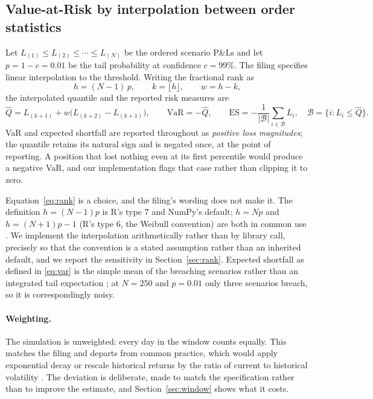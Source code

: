 \documentclass[11pt]{article}
\begin{document}
\subsection{Value-at-Risk by interpolation between order statistics}
\label{sec:var-method}

Let $L_{(1)}\le L_{(2)}\le\cdots\le L_{(N)}$ be the ordered scenario P\&Ls and let
$p=1-c=0.01$ be the tail probability at confidence $c=99\%$. The filing specifies linear
interpolation to the threshold. Writing the fractional rank as
\begin{equation}
  h=(N-1)\,p,
  \qquad
  k=\lfloor h\rfloor,
  \qquad
  w=h-k,
  \label{eq:rank}
\end{equation}
the interpolated quantile and the reported risk measures are
\begin{equation}
  \hat{Q}=L_{(k+1)}+w\bigl(L_{(k+2)}-L_{(k+1)}\bigr),
  \qquad
  \mathrm{VaR}=-\hat{Q},
  \qquad
  \mathrm{ES}=-\frac{1}{|\mathcal{B}|}\sum_{i\in\mathcal{B}}L_i,
  \quad
  \mathcal{B}=\{i: L_i\le\hat{Q}\}.
  \label{eq:var}
\end{equation}
VaR and expected shortfall are reported throughout as \emph{positive loss magnitudes};
the quantile retains its natural sign and is negated once, at the point of reporting. A
position that lost nothing even at its first percentile would produce a negative VaR,
and our implementation flags that case rather than clipping it to zero.

Equation~\eqref{eq:rank} is a choice, and the filing's wording does not make it. The
definition $h=(N-1)p$ is R's type 7 and NumPy's default; $h=Np$ and $h=(N+1)p-1$ (R's
type 6, the Weibull convention) are both in common use \citep{hyndman1996}. We implement
the interpolation arithmetically rather than by library call, precisely so that the
convention is a stated assumption rather than an inherited default, and we report the
sensitivity in Section~\ref{sec:rank}. Expected shortfall as defined in \eqref{eq:var}
is the simple mean of the breaching scenarios rather than an integrated tail expectation
\citep{acerbi2002}; at $N=250$ and $p=0.01$ only three scenarios breach, so it is
correspondingly noisy.

\paragraph{Weighting.} The simulation is unweighted: every day in the window counts
equally. This matches the filing and departs from common practice, which would apply
exponential decay \citep{boudoukh1998} or rescale historical returns by the ratio of
current to historical volatility \citep{baroneadesi1999}. The deviation is deliberate,
made to match the specification rather than to improve the estimate, and
Section~\ref{sec:window} shows what it costs.
\end{document}
